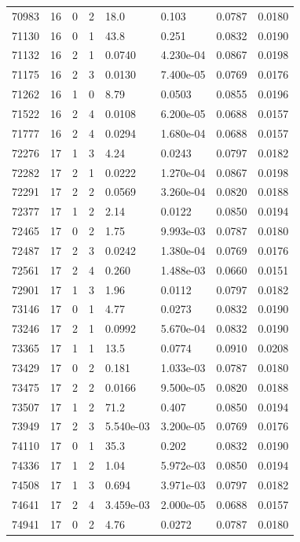 \documentclass[preview]{standalone}
\begin{document}
{{{{{{\begin{tabular}{L{1.2cm}C{1.2cm} C{0.3cm}C{0.5cm} C{1.4cm}C{1.4cm} C{1.4cm}C{1.4cm}}
  70983  &    16  & 0     &  2 &  18.0  & 0.103  & 0.0787 &  0.0180   \\ 
  71130  &    16  & 0     &  1 &  43.8  & 0.251  & 0.0832 &  0.0190   \\ 
  71132  &    16  & 2     &  1 &  0.0740  & 4.230e-04  & 0.0867 &  0.0198   \\ 
  71175  &    16  & 2     &  3 &  0.0130  & 7.400e-05  & 0.0769 &  0.0176   \\ 
  71262  &    16  & 1     &  0 &  8.79  & 0.0503  & 0.0855 &  0.0196   \\ 
  71522  &    16  & 2     &  4 &  0.0108  & 6.200e-05  & 0.0688 &  0.0157   \\ 
  71777  &    16  & 2     &  4 &  0.0294  & 1.680e-04  & 0.0688 &  0.0157   \\ 
  72276  &    17  & 1     &  3 &  4.24  & 0.0243  & 0.0797 &  0.0182   \\ 
  72282  &    17  & 2     &  1 &  0.0222  & 1.270e-04  & 0.0867 &  0.0198   \\ 
  72291  &    17  & 2     &  2 &  0.0569  & 3.260e-04  & 0.0820 &  0.0188   \\ 
  72377  &    17  & 1     &  2 &  2.14  & 0.0122  & 0.0850 &  0.0194   \\ 
  72465  &    17  & 0     &  2 &  1.75  & 9.993e-03  & 0.0787 &  0.0180   \\ 
  72487  &    17  & 2     &  3 &  0.0242  & 1.380e-04  & 0.0769 &  0.0176   \\ 
  72561  &    17  & 2     &  4 &  0.260  & 1.488e-03  & 0.0660 &  0.0151   \\ 
  72901  &    17  & 1     &  3 &  1.96  & 0.0112  & 0.0797 &  0.0182   \\ 
  73146  &    17  & 0     &  1 &  4.77  & 0.0273  & 0.0832 &  0.0190   \\ 
  73246  &    17  & 2     &  1 &  0.0992  & 5.670e-04  & 0.0832 &  0.0190   \\ 
  73365  &    17  & 1     &  1 &  13.5  & 0.0774  & 0.0910 &  0.0208   \\ 
  73429  &    17  & 0     &  2 &  0.181  & 1.033e-03  & 0.0787 &  0.0180   \\ 
  73475  &    17  & 2     &  2 &  0.0166  & 9.500e-05  & 0.0820 &  0.0188   \\ 
  73507  &    17  & 1     &  2 &  71.2  & 0.407  & 0.0850 &  0.0194   \\ 
  73949  &    17  & 2     &  3 &  5.540e-03  & 3.200e-05  & 0.0769 &  0.0176   \\ 
  74110  &    17  & 0     &  1 &  35.3  & 0.202  & 0.0832 &  0.0190   \\ 
  74336  &    17  & 1     &  2 &  1.04  & 5.972e-03  & 0.0850 &  0.0194   \\ 
  74508  &    17  & 1     &  3 &  0.694  & 3.971e-03  & 0.0797 &  0.0182   \\ 
  74641  &    17  & 2     &  4 &  3.459e-03  & 2.000e-05  & 0.0688 &  0.0157   \\ 
  74941  &    17  & 0     &  2 &  4.76  & 0.0272  & 0.0787 &  0.0180   \\ 
\hline 
\end{tabular} 

}}}}}}
\end{document}
